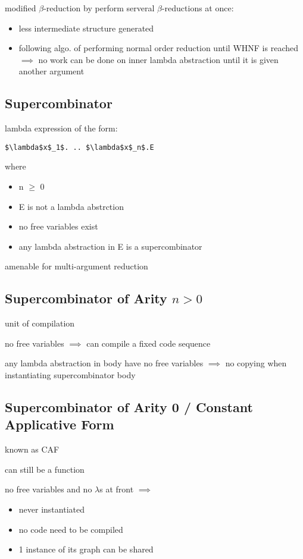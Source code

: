 \documentclass[8pt]{extarticle}
\begin{document}
\begin{multicols*}{2}
\begin{tblr}[]{}
modified $\beta$-reduction by perform serveral $\beta$-reductions at once:
\begin{itemize}
\item less intermediate structure generated
\item following algo. of performing normal order reduction until WHNF is reached $\implies$ no work can be done on inner lambda abstraction until it is given another argument
\end{itemize}

\subsection{Supercombinator}

lambda expression of the form:
\begin{lstlisting}
$\lambda$x$_1$. .. $\lambda$x$_n$.E
\end{lstlisting}
where
\begin{itemize}
\item n $\geq$ 0
\item E is not a lambda abstrction
\item no free variables exist
\item any lambda abstraction in E is a supercombinator
\end{itemize}

amenable for multi-argument reduction

\subsection{Supercombinator of Arity $n>0$}
unit of compilation

no free variables $\implies$ can compile a fixed code sequence

any lambda abstraction in body have no free variables $\implies$ no copying when instantiating supercombinator body

\subsection{Supercombinator of Arity 0 / Constant Applicative Form}

known as CAF

can still be a function

no free variables and no $\lambda$s at front $\implies$
\begin{itemize}
\item never instantiated
\item  no code need to be compiled
\item 1 instance of its graph can be shared
\end{itemize}


\end{tblr}
\end{multicols*}
\end{document}
